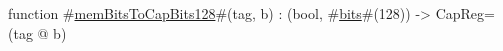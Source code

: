 function #\hyperref[zmemBitsToCapBitsonetwoeight]{memBitsToCapBits128}#(tag, b) : (bool, #\hyperref[zbits]{bits}#(128)) -> CapReg=
  (tag @ b)
